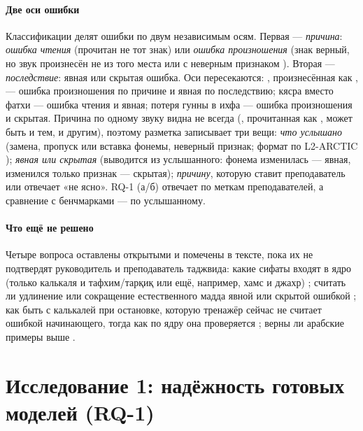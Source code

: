 \paragraph{Две оси ошибки} Классификации делят ошибки по двум независимым осям. Первая --- \emph{причина}:
\emph{ошибка чтения} (прочитан не тот знак) или \emph{ошибка произношения} (знак верный, но звук произнесён
не из того места или с неверным признаком \cite{SRC-059}). Вторая --- \emph{последствие}: явная или скрытая
ошибка. Оси пересекаются: , произнесённая как , --- ошибка произношения по причине и явная по
последствию; кясра вместо фатхи --- ошибка чтения и явная; потеря гунны в ихфа --- ошибка произношения и
скрытая. Причина по одному звуку видна не всегда (, прочитанная как , может быть и тем, и другим),
поэтому разметка записывает три вещи: \emph{что услышано} (замена, пропуск или вставка фонемы, неверный
признак; формат по L2-ARCTIC \cite{SRC-154}); \emph{явная или скрытая} (выводится из услышанного: фонема
изменилась --- явная, изменился только признак --- скрытая); \emph{причину}, которую ставит преподаватель
или отвечает «не ясно». RQ-1 (а/б) отвечает по меткам преподавателей, а сравнение с бенчмарками --- по
услышанному.

\paragraph{Что ещё не решено} Четыре вопроса оставлены открытыми и помечены в тексте, пока их не подтвердят
руководитель и преподаватель таджвида: какие сифаты входят в ядро (только калькаля и тафхим/тарқиқ или ещё,
например, хамс и джахр) ; считать ли удлинение или сокращение естественного мадда явной или
скрытой ошибкой ; как быть с калькалей при остановке, которую тренажёр сейчас не считает ошибкой
начинающего, тогда как по ядру она проверяется ; верны ли арабские примеры выше
.

\section{Исследование 1: надёжность готовых моделей (RQ-1)}\label{sec:method-s1}

